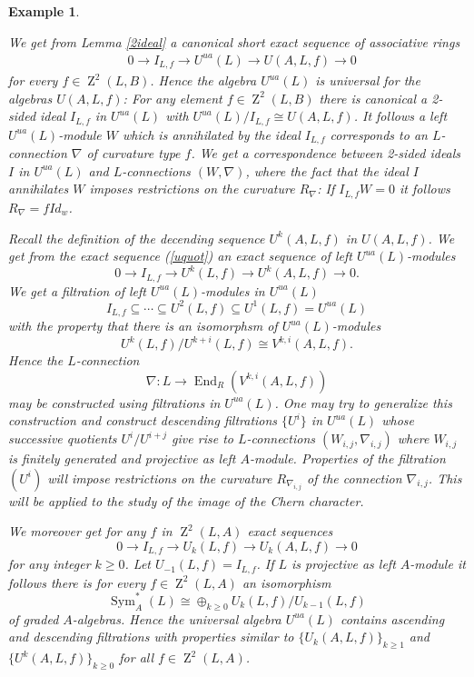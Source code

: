 \documentclass{amsart}
\theoremstyle{plain}
\newtheorem{example}[theorem]{Example}
\theoremstyle{definition}
\theoremstyle{remark}
\numberwithin{equation}{theorem}
\begin{document}
\begin{example}\label{twosided} 

We get from Lemma \ref{2ideal} a canonical short exact sequence of associative rings
\begin{align}
&\label{uquot} 0\rightarrow I_{L,f}\rightarrow {U^{ua}}(L) \rightarrow U({A},L,f)\rightarrow 0
\end{align}
for every $f\in {\operatorname{Z}}^2(L,B)$.
Hence the algebra ${U^{ua}}(L)$ is universal for the algebras $U({A},L,f)$: For any element $f\in {\operatorname{Z}}^2(L,B)$ there is 
canonical a 2-sided
ideal $I_{L,f}$ in ${U^{ua}}(L)$ with ${U^{ua}}(L)/I_{L,f}\cong U({A},L,f)$. It follows a left ${U^{ua}}(L)$-module $W$ which is annihilated
by the ideal $I_{L,f}$ corresponds to an $L$-connection $\nabla$ of curvature type $f$. We get a correspondence between
2-sided ideals $I$ in ${U^{ua}}(L)$ and $L$-connections $(W, \nabla)$, where the fact that the ideal $I$ annihilates $W$ imposes
restrictions on the curvature $R_\nabla$: If $I_{L,f}W=0$ it follows $R_\nabla=fId_w$.

Recall the definition of the decending sequence $U^k({A},L,f)$ in $U({A},L,f)$. We get from the exact sequence (\ref{uquot})
an exact sequence of left ${U^{ua}}(L)$-modules
\[0\rightarrow I_{L,f}\rightarrow U^k(L,f) \rightarrow U^k({A},L,f)\rightarrow 0.\]
We get a filtration of left ${U^{ua}}(L)$-modules in ${U^{ua}}(L)$
\[ I_{L,f}\subseteq \cdots \subseteq U^2(L,f)\subseteq U^1(L,f)={U^{ua}}(L)\]
with the property that there is an isomorphsm of ${U^{ua}}(L)$-modules
\[ U^k(L,f)/U^{k+i}(L,f)\cong V^{k,i}({A},L,f).\]
Hence the $L$-connection
\[\nabla:L\rightarrow {\operatorname{End} }_{R}(V^{k,i}({A},L,f)) \]
may be constructed using filtrations in ${U^{ua}}(L)$. One may try to generalize this construction and construct
descending filtrations $\{U^i\}$ in ${U^{ua}}(L)$ whose successive quotients $U^i/U^{i+j}$ give rise to $L$-connections 
$(W_{i,j},\nabla_{i,j})$ where $W_{i,j}$ is finitely generated and projective as left ${A}$-module. 
Properties of the filtration $(U^i)$ will impose restrictions on the curvature $R_{\nabla_{i,j}}$ of the 
connection $\nabla_{i,j}$. This will be applied to the study of the image of the Chern character.

We moreover get for any $f$ in ${\operatorname{Z}}^2(L,{A})$ exact sequences
\[ 0\rightarrow I_{L,f}\rightarrow U_k(L,f)\rightarrow U_k({A},L,f)\rightarrow 0\]
for any integer $k\geq 0$. Let $U_{-1}(L,f)=I_{L,f}$. If $L$ is projective as left ${A}$-module it follows 
there is for every $f\in {\operatorname{Z}}^2(L,{A})$ an isomorphism
\[ {\operatorname{Sym} }_{A}^*(L)\cong \oplus_{k\geq 0}U_k(L,f)/U_{k-1}(L,f)\]
of graded ${A}$-algebras.
Hence the universal algebra ${U^{ua}}(L)$ contains ascending and descending filtrations with properties similar to
$\{U_k({A},L,f)\}_{k\geq 1}$ and $\{U^k({A},L,f)\}_{k\geq 0}$ for all $f\in {\operatorname{Z}}^2(L,{A})$.
\end{example}
\end{document}
